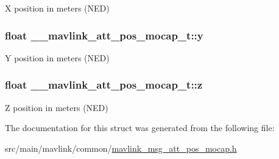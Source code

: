 X position in meters (N\+E\+D) 

\hypertarget{struct____mavlink__att__pos__mocap__t_aa39c9c0dee9ce44ce4ad63ce29e5e23b}{
\subsubsection[{y}]{\setlength{\rightskip}{0pt plus 5cm}float \+\_\+\+\_\+mavlink\+\_\+att\+\_\+pos\+\_\+mocap\+\_\+t\+::y}}\label{struct____mavlink__att__pos__mocap__t_aa39c9c0dee9ce44ce4ad63ce29e5e23b}


Y position in meters (N\+E\+D) 

\hypertarget{struct____mavlink__att__pos__mocap__t_aa7e434319052c1a368ef6ab6175aa3bd}{
\subsubsection[{z}]{\setlength{\rightskip}{0pt plus 5cm}float \+\_\+\+\_\+mavlink\+\_\+att\+\_\+pos\+\_\+mocap\+\_\+t\+::z}}\label{struct____mavlink__att__pos__mocap__t_aa7e434319052c1a368ef6ab6175aa3bd}


Z position in meters (N\+E\+D) 



The documentation for this struct was generated from the following file\+:\begin{DoxyCompactItemize}
\item 
src/main/mavlink/common/\hyperlink{mavlink__msg__att__pos__mocap_8h}{mavlink\+\_\+msg\+\_\+att\+\_\+pos\+\_\+mocap.\+h}\end{DoxyCompactItemize}
